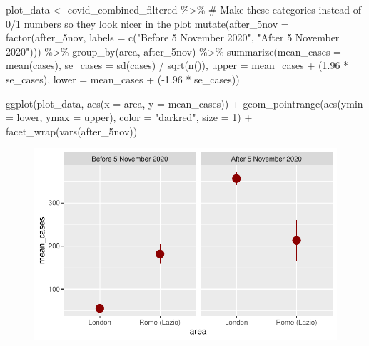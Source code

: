 \documentclass[
  letterpaper,
  DIV=11,
  numbers=noendperiod]{scrreprt}
\newenvironment{Shaded}{\begin{snugshade}}{\end{snugshade}}
\newcommand{\AttributeTok}[1]{\textcolor[rgb]{0.40,0.45,0.13}{#1}}
\newcommand{\CommentTok}[1]{\textcolor[rgb]{0.37,0.37,0.37}{#1}}
\newcommand{\DecValTok}[1]{\textcolor[rgb]{0.68,0.00,0.00}{#1}}
\newcommand{\FloatTok}[1]{\textcolor[rgb]{0.68,0.00,0.00}{#1}}
\newcommand{\FunctionTok}[1]{\textcolor[rgb]{0.28,0.35,0.67}{#1}}
\newcommand{\NormalTok}[1]{\textcolor[rgb]{0.00,0.23,0.31}{#1}}
\newcommand{\OtherTok}[1]{\textcolor[rgb]{0.00,0.23,0.31}{#1}}
\newcommand{\SpecialCharTok}[1]{\textcolor[rgb]{0.37,0.37,0.37}{#1}}
\newcommand{\StringTok}[1]{\textcolor[rgb]{0.13,0.47,0.30}{#1}}
\begin{document}
\begin{Shaded}
\begin{Highlighting}[]
\NormalTok{plot\_data }\OtherTok{\textless{}{-}}\NormalTok{ covid\_combined\_filtered }\SpecialCharTok{\%\textgreater{}\%} 
  \CommentTok{\# Make these categories instead of 0/1 numbers so they look nicer in the plot}
  \FunctionTok{mutate}\NormalTok{(}\AttributeTok{after\_5nov =} \FunctionTok{factor}\NormalTok{(after\_5nov, }\AttributeTok{labels =} \FunctionTok{c}\NormalTok{(}\StringTok{"Before 5 November 2020"}\NormalTok{, }\StringTok{"After 5 November 2020"}\NormalTok{))) }\SpecialCharTok{\%\textgreater{}\%} 
  \FunctionTok{group\_by}\NormalTok{(area, after\_5nov) }\SpecialCharTok{\%\textgreater{}\%} 
  \FunctionTok{summarize}\NormalTok{(}\AttributeTok{mean\_cases =} \FunctionTok{mean}\NormalTok{(cases),}
            \AttributeTok{se\_cases =} \FunctionTok{sd}\NormalTok{(cases) }\SpecialCharTok{/} \FunctionTok{sqrt}\NormalTok{(}\FunctionTok{n}\NormalTok{()),}
            \AttributeTok{upper =}\NormalTok{ mean\_cases }\SpecialCharTok{+}\NormalTok{ (}\FloatTok{1.96} \SpecialCharTok{*}\NormalTok{ se\_cases),}
            \AttributeTok{lower =}\NormalTok{ mean\_cases }\SpecialCharTok{+}\NormalTok{ (}\SpecialCharTok{{-}}\FloatTok{1.96} \SpecialCharTok{*}\NormalTok{ se\_cases)) }

\FunctionTok{ggplot}\NormalTok{(plot\_data, }\FunctionTok{aes}\NormalTok{(}\AttributeTok{x =}\NormalTok{ area, }\AttributeTok{y =}\NormalTok{ mean\_cases)) }\SpecialCharTok{+}
  \FunctionTok{geom\_pointrange}\NormalTok{(}\FunctionTok{aes}\NormalTok{(}\AttributeTok{ymin =}\NormalTok{ lower, }\AttributeTok{ymax =}\NormalTok{ upper), }
                  \AttributeTok{color =} \StringTok{"darkred"}\NormalTok{, }\AttributeTok{size =} \DecValTok{1}\NormalTok{) }\SpecialCharTok{+}
  \FunctionTok{facet\_wrap}\NormalTok{(}\FunctionTok{vars}\NormalTok{(after\_5nov))}
\end{Highlighting}
\end{Shaded}

\begin{figure}[H]

{\centering \includegraphics{longitudinal-2_files/figure-pdf/unnamed-chunk-13-1.pdf}

}

\end{figure}
\end{document}
